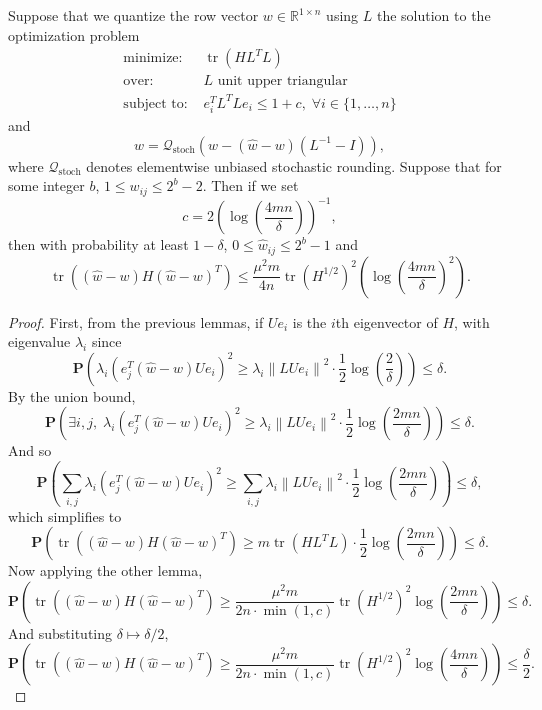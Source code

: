 \begin{toappendix}
\begin{lemma}
Suppose that we quantize the row vector $w \in \mathbb{R}^{1 \times n}$ using $L$ the solution to the optimization problem
\begin{align*}
    \mbox{minimize: } & \operatorname{tr}\left(H L^T L\right) \\
    \mbox{over: } & L \text{ unit upper triangular} \\
    \mbox{subject to: } & e_i^T L^T L e_i \le 1 + c, \; \forall i \in \{1,\ldots,n\}
\end{align*}
and
\[
	\hat w = \mathcal{Q}_{\operatorname{stoch}}\left( w - (\hat w - w) (L^{-1} - I) \right),
\]
where $\mathcal{Q}_{\operatorname{stoch}}$ denotes elementwise unbiased stochastic rounding. Suppose that for some integer $b$, $1 \le w_{ij} \le 2^{b} - 2$. Then if we set
\[
	c = 2 \left( \log\left( \frac{4 m n}{\delta} \right) \right)^{-1},
\]
then with probability at least $1 - \delta$, $0 \le \hat w_{ij} \le 2^{b} - 1$ and
\[
	\operatorname{tr}\left( (\hat w - w) H (\hat w - w)^T \right) \le \frac{\mu^2 m}{4n} \operatorname{tr}\left(H^{1/2}\right)^2 \left( \log\left( \frac{4 mn}{\delta}\right)^2 \right).
\]
\end{lemma}
\begin{proof}
First, from the previous lemmas, if $U e_i$ is the $i$th eigenvector of $H$, with eigenvalue $\lambda_i$ since
\[
	\mathbf{P}\left( \lambda_i ( e_j^T (\hat w - w) U e_i )^2 \ge \lambda_i \left\|L U e_i\right\|^2 \cdot \frac{1}{2} \log\left( \frac{2}{\delta} \right) \right) \le \delta.
\]
By the union bound,
\[
	\mathbf{P}\left( \exists i,j, \; \lambda_i ( e_j^T (\hat w - w) U e_i )^2 \ge \lambda_i \left\|L U e_i\right\|^2 \cdot \frac{1}{2} \log\left( \frac{2 mn}{\delta} \right) \right) \le \delta.
\]
And so
\[
	\mathbf{P}\left( \sum_{i,j} \lambda_i ( e_j^T (\hat w - w) U e_i )^2 \ge \sum_{i,j} \lambda_i \left\|L U e_i\right\|^2 \cdot \frac{1}{2} \log\left( \frac{2 mn}{\delta} \right) \right) \le \delta,
\]
which simplifies to
\[
	\mathbf{P}\left( \operatorname{tr}\left( (\hat w - w) H (\hat w - w)^T \right) \ge m \operatorname{tr}\left(H L^T L\right) \cdot \frac{1}{2} \log\left( \frac{2 mn}{\delta} \right) \right) \le \delta.
\]
Now applying the other lemma,
\[
	\mathbf{P}\left( \operatorname{tr}\left( (\hat w - w) H (\hat w - w)^T \right) \ge \frac{\mu^2 m}{2n \cdot \min(1,c)} \operatorname{tr}\left(H^{1/2}\right)^2 \log\left( \frac{2 mn}{\delta} \right) \right) \le \delta.
\]
And substituting $\delta \mapsto \delta/2$,
\[
	\mathbf{P}\left( \operatorname{tr}\left( (\hat w - w) H (\hat w - w)^T \right) \ge \frac{\mu^2 m}{2n \cdot \min(1,c)} \operatorname{tr}\left(H^{1/2}\right)^2 \log\left( \frac{4 mn}{\delta} \right) \right) \le \frac{\delta}{2}.
\]
\end{proof}
\end{toappendix}
